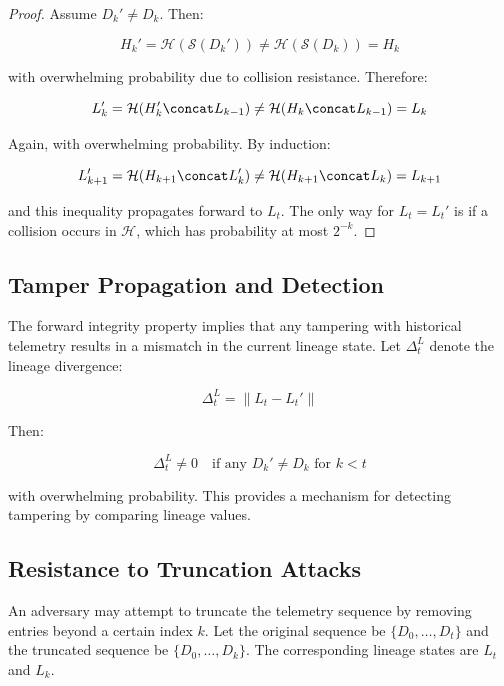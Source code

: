 \begin{proof}
Assume $D_k' \neq D_k$. Then:

\[
H_k' = \mathcal{H}(\mathcal{S}(D_k')) \neq \mathcal{H}(\mathcal{S}(D_k)) = H_k
\]

with overwhelming probability due to collision resistance. Therefore:

\[
L_k' = \mathcal{H}(H_k' \concat L_{k-1}) \neq \mathcal{H}(H_k \concat L_{k-1}) = L_k
\]

Again, with overwhelming probability. By induction:

\[
L_{k+1}' = \mathcal{H}(H_{k+1} \concat L_k') \neq \mathcal{H}(H_{k+1} \concat L_k) = L_{k+1}
\]

and this inequality propagates forward to $L_t$. The only way for $L_t = L_t'$ is if a collision occurs in $\mathcal{H}$, which has probability at most $2^{-k}$.
\end{proof}

\subsection{Tamper Propagation and Detection}

The forward integrity property implies that any tampering with historical telemetry results in a mismatch in the current lineage state. Let $\Delta_t^L$ denote the lineage divergence:

\begin{equation}
\Delta_t^L = \| L_t - L_t' \|
\end{equation}

Then:

\begin{equation}
\Delta_t^L \neq 0 \quad \text{if any } D_k' \neq D_k \text{ for } k < t
\end{equation}

with overwhelming probability. This provides a mechanism for detecting tampering by comparing lineage values.

\subsection{Resistance to Truncation Attacks}

An adversary may attempt to truncate the telemetry sequence by removing entries beyond a certain index $k$. Let the original sequence be $\{D_0, \dots, D_t\}$ and the truncated sequence be $\{D_0, \dots, D_k\}$. The corresponding lineage states are $L_t$ and $L_k$.

